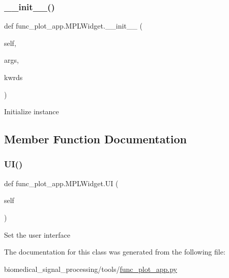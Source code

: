 \subsubsection{\texorpdfstring{\+\_\+\+\_\+init\+\_\+\+\_\+()}{\_\_init\_\_()}}
{\footnotesize\ttfamily def func\+\_\+plot\+\_\+app.\+M\+P\+L\+Widget.\+\_\+\+\_\+init\+\_\+\+\_\+ (\begin{DoxyParamCaption}\item[{}]{self,  }\item[{}]{args,  }\item[{}]{kwrds }\end{DoxyParamCaption})}

\begin{DoxyVerb}Initialize instance
\end{DoxyVerb}
 

\subsection{Member Function Documentation}
\mbox{\label{classfunc__plot__app_1_1MPLWidget_a463c8301c1f6e40f2f7bb76e5031af5a}} 
\subsubsection{\texorpdfstring{U\+I()}{UI()}}
{\footnotesize\ttfamily def func\+\_\+plot\+\_\+app.\+M\+P\+L\+Widget.\+UI (\begin{DoxyParamCaption}\item[{}]{self }\end{DoxyParamCaption})}

\begin{DoxyVerb}Set the user interface
\end{DoxyVerb}
 

The documentation for this class was generated from the following file\+:\begin{DoxyCompactItemize}
\item 
biomedical\+\_\+signal\+\_\+processing/tools/\hyperlink{func__plot__app_8py}{func\+\_\+plot\+\_\+app.\+py}\end{DoxyCompactItemize}
